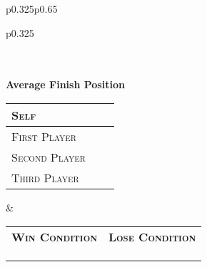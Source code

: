 \documentclass{article}
\begin{document}
\begin{tabular}{p{}p{}}
\begin{tabular}{p{}}
\begin{tikzpicture}
      		\filldraw[fill=MarzDarkRed] (\fpeval{((\averageTurnNumber-\offset)/\steps) - 0.5} cm,-1.5 cm) circle (3pt);
		\end{tikzpicture}
		\\\\
		\Large{\textbf{Average Finish Position}}\\
		\calculateThreePlayerAverageFinishPositions{\logbook}
		\hspace*{0.5cm}\begin{tabular}{|p{}c|r|}
			\hline
			\textsc{Self} && \averageSelfFinishPosition \\\hline
			\textsc{First Player} && \averageFirstPlayerFinish \\\hline
			\textsc{Second Player} && \averageSecondPlayerFinish \\\hline
			\textsc{Third Player} && \averageThirdPlayerFinish \\\hline
		\end{tabular}
	\end{tabular}
	&
	\def\informationradius{2}
	\begin{tabular}{m{}m{}}
		\large{\textbf{\textsc{Win Condition}}} & \large{\textbf{\textsc{Lose Condition}}}
		\\
		\calculateWinConditionsPercentages{\logbook}{WIN}%
		\begin{tikzpicture}%
			\pie[explode=0.05, text=legend, radius=\informationradius, color={MarzDarkRed, MarzPurple, MarzRoyal, MarzOrange, MarzGold}, before number=\printonlypositive, after number=, at={(0, 0)}]{%
				\hpopercentage/Hit Points 0,
				\poisonpercentage/Poison,
				\deckoutpercentage/Deck-Out,
				\cardeffectpercentage/Card Effect,
				\commanderdamagepercentage/ Commander Damage
			}%
			\node at (-2.25,2.25) {};%
			\node at (-2.25,-2.25) {};%
		\end{tikzpicture}%
		&
		\calculateWinConditionsPercentages{\logbook}{LOSE}%
		\begin{tikzpicture}%
			\pie[explode=0.05, text=legend, radius=\informationradius, color={MarzDarkRed, MarzPurple, MarzRoyal, MarzOrange, MarzGold}, before number=\printonlypositive, after number=,]{%
				\hpopercentage/Hit Points 0,
				\poisonpercentage/Poison,
				\deckoutpercentage/Deck-Out,
				\cardeffectpercentage/Card Effect,
				\commanderdamagepercentage/ Commander Damage
			}%
			\node at (-2.25,2.25) {};%
			\node at (-2.25,-2.25) {};%
		\end{tikzpicture}%
		\\\\\\

\end{tabular}
\end{tabular}
\end{document}
